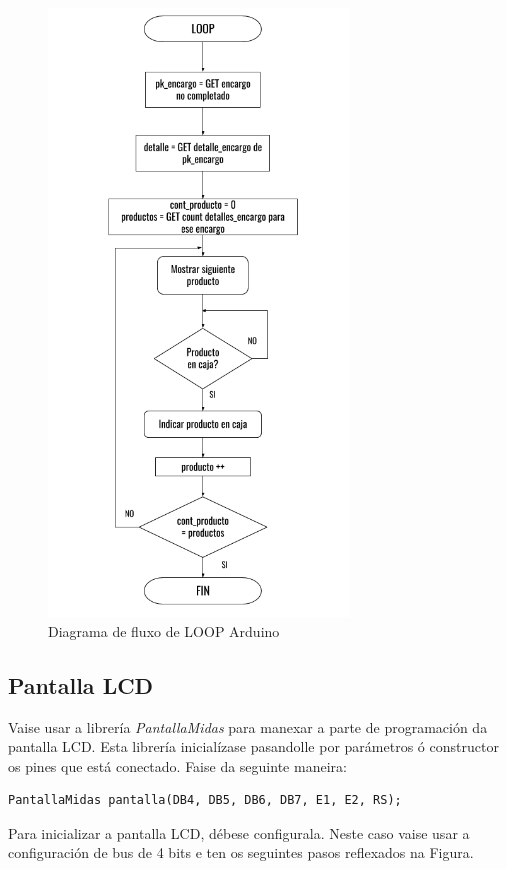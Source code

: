 \documentclass[11pt,twoside]{book}
\begin{document}
\begin{figure}[H]
	\begin{center}
		\includegraphics[width=8cm]{images/diagrama_flujo_loop.png}
	\end{center}
	\caption{Diagrama de fluxo de LOOP Arduino}
	\label{fig:FluxoLOOP}
\end{figure}
 
 \subsection{Pantalla LCD}

Vaise usar a librería \textit{PantallaMidas} para manexar a parte de programación da pantalla LCD. Esta librería inicialízase pasandolle por parámetros ó constructor os pines que está conectado. Faise da seguinte maneira:

\begin{verbatim}
PantallaMidas pantalla(DB4, DB5, DB6, DB7, E1, E2, RS);
\end{verbatim}

Para inicializar a pantalla LCD, débese configurala. Neste caso vaise usar a configuración de bus de 4 bits e ten os seguintes pasos reflexados na Figura.
\end{document}
